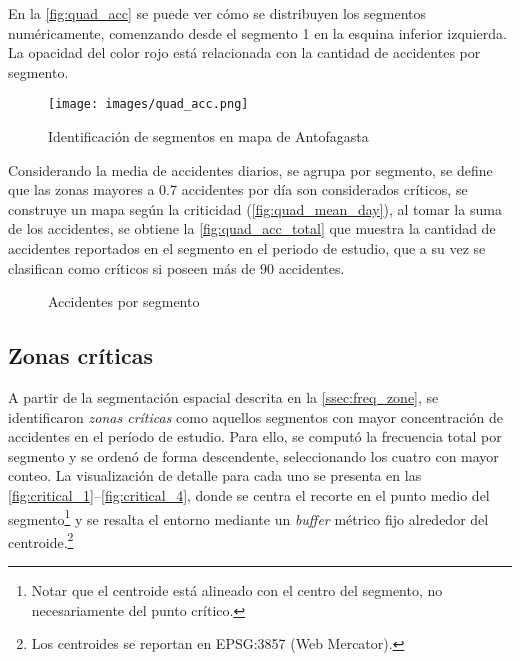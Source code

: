 \documentclass[12pt]{article}
\begin{document}
En la \autoref{fig:quad_acc} se puede ver cómo se distribuyen los segmentos numéricamente, comenzando desde el segmento 1 en la esquina inferior izquierda. La opacidad del color rojo está relacionada con la cantidad de accidentes por segmento.

\begin{figure}[H]
    \centering
    \texttt{[image: images/quad\_acc.png]}
    \caption{Identificación de segmentos en mapa de Antofagasta}
    \label{fig:quad_acc}
\end{figure}

Considerando la media de accidentes diarios, se agrupa por segmento, se define que las zonas mayores a 0.7 accidentes por día son considerados críticos, se construye un mapa según la criticidad (\autoref{fig:quad_mean_day}), al tomar la suma de los accidentes, se obtiene la \autoref{fig:quad_acc_total} que muestra la cantidad de accidentes reportados en el segmento en el periodo de estudio, que a su vez se clasifican como críticos si poseen más de 90 accidentes.

\begin{figure}[H]
    \centering
    \caption{Accidentes por segmento}
\end{figure}


\subsection{Zonas críticas}\label{ssec:critical_zones}

A partir de la segmentación espacial descrita en la \autoref{ssec:freq_zone}, se identificaron \textit{zonas críticas} como aquellos segmentos con mayor concentración de accidentes en el período de estudio. Para ello, se computó la frecuencia total por segmento y se ordenó de forma descendente, seleccionando los cuatro con mayor conteo. La visualización de detalle para cada uno se presenta en las \autoref{fig:critical_1}--\autoref{fig:critical_4}, donde se centra el recorte en el punto medio del segmento\footnote{Notar que el centroide está alineado con el centro del segmento, no necesariamente del punto crítico.} y se resalta el entorno mediante un \textit{buffer} métrico fijo alrededor del centroide.\footnote{Los centroides se reportan en EPSG:3857 (Web Mercator).}
\end{document}
